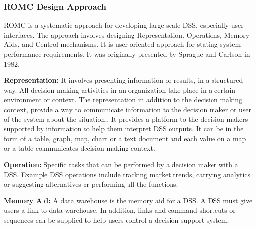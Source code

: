 \subsubsection{ROMC Design Approach}
ROMC is a systematic approach for developing large-scale DSS, especially user interfaces. The approach involves designing Representation, Operations, Memory Aids, and Control mechanisms. It is user-oriented approach for stating system performance requirements. It was originally presented by Sprague and Carlson in 1982.\cite{ROMC}

\textbf{Representation:} It involves presenting information or results, in a structured way.
All decision making activities in an organization take place in a certain environment or context. The representation in addition to the decision making context, provide a way to communicate information to the decision maker or user of the system about the situation.\cite{ROMC,DSS}. It provides a platform to the decision makers supported by information to help them interpret DSS outputs. It can be in the form of a table, graph, map, chart or a text document and each value on a map or a table communicates decision making context.\cite{ROMC,DSS}

\textbf{Operation: }Specific tasks that can be performed by a decision maker with a DSS. Example DSS operations include tracking market trends, carrying analytics or suggesting alternatives or performing all the functions.\cite{DSS}

\textbf{Memory Aid: }A data warehouse is the memory aid for a DSS. A DSS must give users a link to data warehouse. In addition, links and command shortcuts or sequences can be supplied to help users control a decision support system.\cite{DSS}

